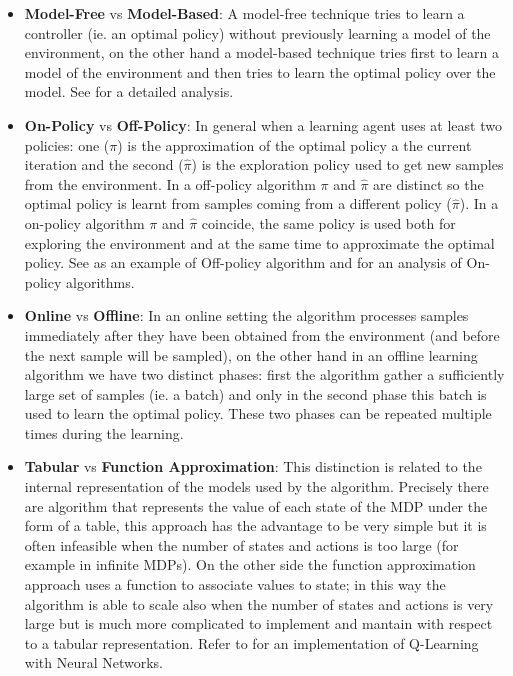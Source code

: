 	\begin{itemize}
		\item \textbf{Model-Free} vs \textbf{Model-Based}: A model-free technique tries to learn a controller (ie. an optimal policy) without
			previously learning a model of the environment, on the other hand a model-based technique tries first to learn a model of the environment
			and then tries to learn the optimal policy over the model. See \cite{atkeson1997comparison} for a detailed analysis.

		\item \textbf{On-Policy} vs \textbf{Off-Policy}: In general when a learning agent uses at least two policies: one ($\pi$) is the approximation
			of the optimal policy a the current iteration and the second ($\hat{\pi}$) is the exploration policy used to get new samples from the environment.
			In a off-policy algorithm $\pi$ and $\hat{\pi}$ are distinct so the optimal policy is learnt from samples coming from a different policy ($\hat{\pi}$).
			In a on-policy algorithm $\pi$ and $\hat{\pi}$ coincide, the same policy is used both for exploring the environment and at the same time to approximate the
			optimal policy. See \cite{precup2001off} as an example of Off-policy algorithm and \cite{singh2000convergence} for an analysis of On-policy algorithms.

		\item \textbf{Online} vs \textbf{Offline}: In an online setting the algorithm processes samples immediately after they have been obtained from the environment
			(and before the next sample will be sampled), on the other hand in an offline learning algorithm we have two distinct phases: first the algorithm gather a
			sufficiently large set of samples (ie. a batch) and only in the second phase this batch is used to learn the optimal policy. These two phases can be
			repeated multiple times during the learning.

		\item \textbf{Tabular} vs \textbf{Function Approximation}: This distinction is related to the internal representation of the models used by the algorithm.
			Precisely there are algorithm that represents the value of each state of the MDP under the form of a table, this approach has the advantage to be very simple
			but it is often infeasible when the number of states and actions is too large (for example in infinite MDPs). On the other side the function approximation
			approach uses a function to associate values to state; in this way the algorithm is able to scale also when the number of states and actions is very large
			but is much more complicated to implement and mantain with respect to a tabular representation. Refer to \cite{huang2005reinforcement} for an implementation
			of Q-Learning with Neural Networks.


\end{itemize}

